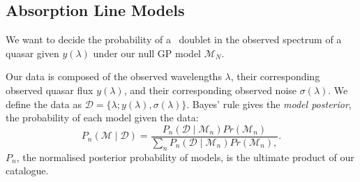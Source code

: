 \documentclass[fleqn,usenatbib]{mnras}
\newcommand{\civ}{\ion{C}{IV}}
\newcommand{\nciv}{N_{\civ}} %
\newcommand{\zciv}{z_{\civ}}
\newcommand{\sciv}{\sigma_{\civ}}
\newcommand{\Data}{\mathcal{D}}
\newcommand{\model}{\mathcal{M}}
\begin{document}

\subsection{Absorption Line Models}
\label{sec:civ-model}

We want to decide the probability of
a \civ\ doublet in the observed spectrum of a quasar given $y(\lambda)$ under our null GP model $\model_N$.

Our data  is composed of the observed wavelengths $\lambda$,
their corresponding
observed quasar flux $y( \lambda)$, and their corresponding
 observed noise $ \sigma(\lambda)$.
We define the data as $\Data = \{\lambda; y( \lambda), \sigma(\lambda)\}$.
Bayes' rule gives the \emph{model posterior}, the probability of each model given the data:
 \begin{equation}
  P_n(\model \mid \Data) =
  \frac{P_n(\Data \mid \model_n)Pr(\model_n)}{
     \sum_n P_n(\Data \mid \model_n)Pr(\model_n),
  }.
  \label{eq:model_selection}
\end{equation}
$P_n$, the normalised posterior probability of models, is the ultimate product of our catalogue.
\end{document}
